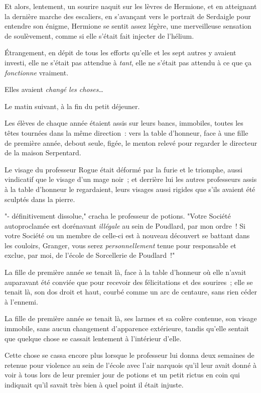 Et alors, lentement, un sourire naquit sur les lèvres de Hermione, et en atteignant la dernière marche des escaliers, en s'avançant vers le portrait de Serdaigle pour entendre son énigme, Hermione se sentit assez légère, une merveilleuse sensation de soulèvement, comme si elle s'était fait injecter de l'hélium.

Étrangement, en dépit de tous les efforts qu'elle et les sept autres y avaient investi, elle ne s'était pas attendue à \emph{tant}, elle ne s'était pas attendu à ce que ça \emph{fonctionne} vraiment.

Elles avaient \emph{changé les choses}…

\later

Le matin suivant, à la fin du petit déjeuner.

Les élèves de chaque année étaient assis sur leurs bancs, immobiles, toutes les têtes tournées dans la même direction~: vers la table d'honneur, face à une fille de première année, debout seule, figée, le menton relevé pour regarder le directeur de la maison Serpentard.

Le visage du professeur Rogue était déformé par la furie et le triomphe, aussi vindicatif que le visage d'un mage noir~; et derrière lui les autres professeurs assis à la table d'honneur le regardaient, leurs visages aussi rigides que s'ils avaient été sculptés dans la pierre.

"- définitivement dissolue," cracha le professeur de potions. "Votre Société autoproclamée est dorénavant \emph{illégale} au sein de Poudlard, par mon ordre~! Si votre Société ou un membre de celle-ci est à nouveau découvert se battant dans les couloirs, Granger, vous serez \emph{personnellement} tenue pour responsable et exclue, par moi, de l'école de Sorcellerie de Poudlard~!"

La fille de première année se tenait là, face à la table d'honneur où elle n'avait auparavant été conviée que pour recevoir des félicitations et des sourires~; elle se tenait là, son dos droit et haut, courbé comme un arc de centaure, sans rien céder à l'ennemi.

La fille de première année se tenait là, ses larmes et sa colère contenue, son visage immobile, sans aucun changement d'apparence extérieure, tandis qu'elle sentait que quelque chose se cassait lentement à l'intérieur d'elle.

Cette chose se cassa encore plus lorsque le professeur lui donna deux semaines de retenue pour violence au sein de l'école avec l'air narquois qu'il leur avait donné à voir à tous lors de leur premier jour de potions et un petit rictus en coin qui indiquait qu'il savait très bien à quel point il était injuste.

